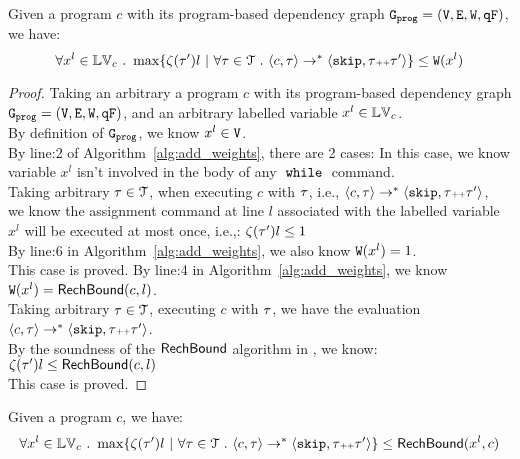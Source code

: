 
{
  \begin{thm}
    \label{thm:addweight_soundness}
  Given a program ${c}$ with its program-based dependency graph $\mathtt{{G_{prog}}} = (\mathtt{V}, \mathtt{E}, \mathtt{W}, \mathtt{qF})$, we have:
  \[
  \forall x^l \in \lvar_c \st 
  \max \left\{ \vcounter(\vtrace') l ~ \middle\vert~
  \forall \vtrace \in \mathcal{T} \st \config{{c}, \trace} \to^{*} \config{\eskip, \trace\tracecat\vtrace'} \right\} 
  \leq 
  \weights(x^l)
  \]
  \end{thm}
}
\begin{proof}
  Taking an arbitrary a program ${c}$ with its program-based dependency graph $\mathtt{{G_{prog}}} = (\mathtt{V}, \mathtt{E}, \mathtt{W}, \mathtt{qF})$, and an arbitrary labelled variable $x^l \in \mathbb{LV}_c$.
  \\
  By definition of $\mathtt{{G_{prog}}}$, we know $ x^l \in \mathtt{V}$. 
  \\
  By line:2 of Algorithm~\ref{alg:add_weights}, there are 2 cases:
  In this case, we know variable $x^l$ isn't involved in the body of any $\;\mathtt{while}\;$ command. 
  \\
  Taking arbitrary $\mathtt{\tau} \in \mathcal{T}$, when executing $c$ with $\mathtt{\tau}$, i.e., $\langle {c}, \mathtt{\tau} \rangle \to^{*} \langle \mathtt{skip}, \mathtt{\tau}{\scriptscriptstyle ++}\mathtt{\tau}' \rangle$,
  \\
  we know the
  assignment command at line $l$ associated with the labelled variable $x^l$ will be executed at most once, i.e.,:
  $\mathtt{\zeta}(\mathtt{\tau}') l \leq 1$
  \\
  By line:6 in Algorithm~\ref{alg:add_weights}, we also know $\mathtt{W}(x^l) = 1$.
  \\
  This case is proved.
  By line:4 in Algorithm~\ref{alg:add_weights}, we know  $\mathtt{W}(x^l) = \mathsf{RechBound}(c, l)$.
  \\
  Taking arbitrary $\mathtt{\tau} \in \mathcal{T}$, executing $c$ with $\mathtt{\tau}$, we have the evaluation $\langle {c}, \mathtt{\tau} \rangle \to^{*} \langle \mathtt{skip}, \mathtt{\tau}{\scriptscriptstyle ++}\mathtt{\tau}' \rangle$.
  \\
  By the soundness of the $\mathsf{RechBound}$ algorithm in \cite{Sumit2010rechability}, we know:
$\mathtt{\zeta}(\mathtt{\tau}') l \leq \mathsf{RechBound}(c, l)$
\\
This case is proved.
\end{proof}

\begin{lem}
  \label{lem:reachability_soundness}
Given a program ${c}$, we have:
%
\[
\forall x^l \in \lvar_c \st 
\max \left\{ \vcounter(\vtrace') l ~ \middle\vert~
\forall \vtrace \in \mathcal{T} \st \config{{c}, \trace} \to^{*} \config{\eskip, \trace\tracecat\vtrace'} \right\} 
\leq 
\rb(x^l, c)
\]
\end{lem}

